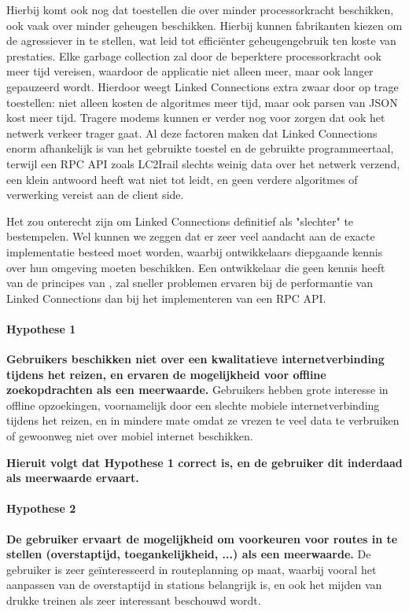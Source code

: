 Hierbij komt ook nog dat toestellen die over minder processorkracht beschikken, ook vaak over minder geheugen beschikken. Hierbij kunnen fabrikanten kiezen om de  agressiever in te stellen, wat leid tot efficiënter geheugengebruik ten koste van prestaties. %
Elke garbage collection zal door de beperktere processorkracht ook meer tijd vereisen, waardoor de applicatie niet alleen meer, maar ook langer gepauzeerd wordt. Hierdoor weegt Linked Connections extra zwaar door op trage toestellen: niet alleen kosten de algoritmes meer tijd, maar ook parsen van JSON kost meer tijd. Tragere modems kunnen er verder nog voor zorgen dat ook het netwerk verkeer trager gaat. Al deze factoren maken dat Linked Connections enorm afhankelijk is van het gebruikte toestel en de gebruikte programmeertaal, terwijl een RPC API zoals LC2Irail slechts weinig data over het netwerk verzend, een klein antwoord heeft wat niet tot  leidt, en geen verdere algoritmes of verwerking vereist aan de client side. 

Het zou onterecht zijn om Linked Connections definitief als "slechter" te bestempelen. Wel kunnen we zeggen dat er zeer veel aandacht aan de exacte implementatie besteed moet worden, waarbij ontwikkelaars diepgaande kennis over hun omgeving moeten beschikken. Een ontwikkelaar die geen kennis heeft van de principes van , zal sneller problemen ervaren bij de performantie van Linked Connections dan bij het implementeren van een RPC API.

\paragraph{Hypothese 1} \textbf{Gebruikers beschikken niet over een kwalitatieve internetverbinding tijdens het reizen, en ervaren de mogelijkheid voor offline zoekopdrachten als een meerwaarde.}
	Gebruikers hebben grote interesse in offline opzoekingen, voornamelijk door een slechte mobiele internetverbinding tijdens het reizen, en in mindere mate omdat ze vrezen te veel data te verbruiken of gewoonweg niet over mobiel internet beschikken.
	
\textbf{Hieruit volgt dat Hypothese 1 correct is, en de gebruiker dit inderdaad als meerwaarde ervaart.
}
\paragraph{Hypothese 2}\textbf{De gebruiker ervaart de mogelijkheid om voorkeuren voor routes in te stellen (overstaptijd, toegankelijkheid, ...) als een meerwaarde.}
	De gebruiker is zeer geïnteresseerd in routeplanning op maat, waarbij vooral het aanpassen van de overstaptijd in stations belangrijk is, en ook het mijden van drukke treinen als zeer interessant beschouwd wordt.


